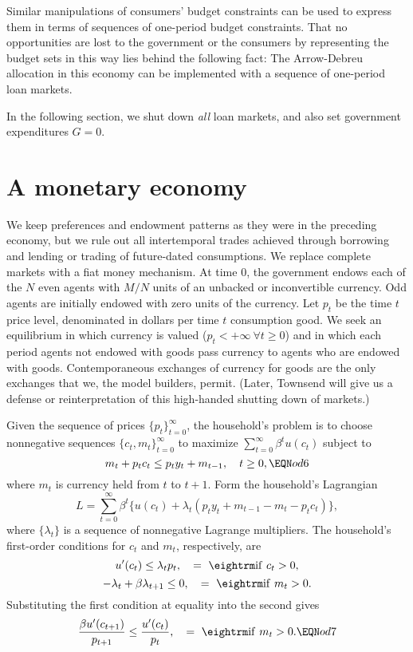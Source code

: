 Similar  manipulations of consumers' budget constraints can
be used to express them in terms of sequences of one-period
budget constraints.  That no opportunities are lost to
the government or the consumers by representing the budget
sets in this way lies behind the following fact:
  The Arrow-Debreu allocation in this economy can be
implemented with a sequence of one-period loan markets.


In the following section, we shut down {\it all} loan markets,
and also set government expenditures $G=0$.


\section{A monetary economy}
   We keep preferences and endowment patterns as they
were in the preceding economy, but we rule out all intertemporal
trades achieved through borrowing and lending or
trading of future-dated consumptions.
We replace complete markets with
a fiat money mechanism.  At time $0$, the government
endows each of the $N$ even agents with $M/N$ units
of an unbacked or inconvertible currency.  Odd agents
are initially endowed with zero units of the currency.
Let $p_t$ be the time $t$ price level, denominated in dollars
per time $t$ consumption good.  We seek an equilibrium
in which currency is valued ($p_t < + \infty \ \forall t \geq 0$)
and in which each period agents not endowed with goods pass currency
to agents who are endowed with goods. Contemporaneous exchanges
of currency for goods are the only exchanges that
we, the model builders, permit.  (Later, Townsend will give us a defense
or reinterpretation of this high-handed shutting down of
markets.)

Given the sequence of prices $\{ p_t \}_{t=0}^\infty$, the
household's problem is to choose nonnegative sequences
$\{ c_t, m_t\}_{t=0}^\infty$ to maximize $\sum_{t=0}^\infty
\beta^t u(c_t)$ subject to
$$ m_t + p_t c_t \leq p_t y_t + m_{t-1} , \quad t \geq 0, \EQN od6$$
where $m_t$ is currency held from $t$ to $t+1$.
   Form the household's Lagrangian
$$L = \sum_{t=0}^\infty \beta^t \{ u(c_t) +
  \lambda_t ( p_t y_t + m_{t-1}  - m_t - p_t c_t ) \} ,$$
where $\{ \lambda_t \}$ is a sequence of nonnegative
Lagrange multipliers.
The household's first-order conditions  for $c_t$ and
$m_t$, respectively, are
$$ u'(c_t) \leq \lambda_t p_t, \quad = \ {\rm if  } \ c_t > 0 ,$$
$$ - \lambda_t + \beta \lambda_{t+1} \leq 0 , \quad = \ {\rm  if } \
    m_t > 0 .$$
Substituting the first condition at equality into the
second gives
$$ { \beta u'(c_{t+1}) \over p_{t+1}} \leq {u'(c_t) \over p_t } , \quad
   = \ {\rm if} \ m_t > 0 .  \EQN od7 $$

